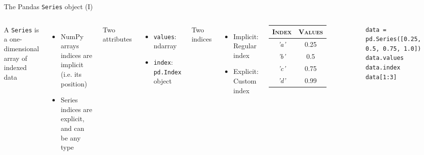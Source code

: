 \documentclass[10pt,compress]{beamer} %
\begin{document}
\begin{frame}[fragile]{The Pandas \texttt{Series} object (I)}
	\begin{columns}

		A \texttt{Series} is a one-dimensional array of indexed data
		\begin{itemize}
			\item NumPy arrays indices are implicit (i.e. its position)
			\item Series indices are explicit, and can be any type
		\end{itemize}
		Two attributes
		\begin{itemize}
			\item \texttt{values}: ndarray
			\item \texttt{index}: \texttt{pd.Index} object
		\end{itemize}
		Two indices
		\begin{itemize}
			\item Implicit: Regular index
			\item Explicit: Custom index
		\end{itemize}

	   \centering
      	\begin{tabularx}{2.7cm}{|c|c|}
			\hline
       		\textsc{Index} &  \textsc{Values}\\ \hline
       		\textit{'a'} & 0.25 \\
       		\textit{'b'} & 0.5  \\
       		\textit{'c'} & 0.75 \\
       		\textit{'d'} & 0.99 \\\hline
    	\end{tabularx}

		\bigskip

		\begin{exampleblock}{}
		\vspace{-0.2cm} 
			\begin{lstlisting}
data = pd.Series([0.25, 0.5, 0.75, 1.0])
data.values
data.index
data[1:3]
\end{lstlisting}
		\vspace{-0.2cm} 
		\end{exampleblock}
	\end{columns}
\end{frame}
\end{document}
